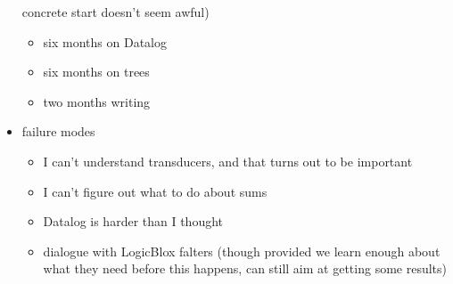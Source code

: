 \documentclass{article}
\begin{document}
\begin{itemize}
        concrete start doesn't seem awful)
        \begin{itemize}
            \item six months on Datalog
            \item six months on trees
            \item two months writing
        \end{itemize}
    \item failure modes
        \begin{itemize}
            \item I can't understand transducers, and that turns out to be
                important
            \item I can't figure out what to do about sums
            \item Datalog is harder than I thought
            \item dialogue with LogicBlox falters (though provided we learn enough
                about what they need before this happens, can still aim at
                getting some results)
        \end{itemize}
\end{itemize}
\end{document}
